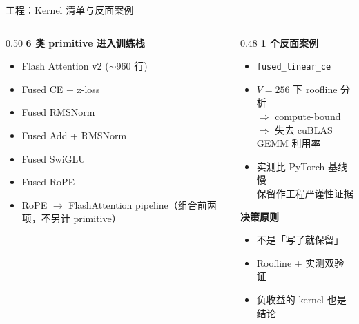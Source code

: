 \documentclass[10pt,aspectratio=169]{beamer}
\begin{document}
\begin{frame}{工程：Kernel 清单与反面案例}
\begin{columns}[T]
\begin{column}{0.50\textwidth}
\textbf{6 类 primitive 进入训练栈}
\begin{itemize}\setlength{\itemsep}{2pt}
  \item Flash Attention v2 ($\sim$960 行)
  \item Fused CE + z-loss
  \item Fused RMSNorm
  \item Fused Add + RMSNorm
  \item Fused SwiGLU
  \item Fused RoPE
  \item RoPE $\to$ FlashAttention pipeline（组合前两项，不另计 primitive）
\end{itemize}
\end{column}
\begin{column}{0.48\textwidth}
\textbf{1 个反面案例}
\begin{itemize}
  \item \texttt{fused\_linear\_ce}
  \item $V = 256$ 下 roofline 分析 \\
        $\Rightarrow$ compute-bound \\
        $\Rightarrow$ 失去 cuBLAS GEMM 利用率
  \item 实测比 PyTorch 基线慢 \\
        \alert{保留作工程严谨性证据}
\end{itemize}

\bigskip
\textbf{决策原则}
\begin{itemize}
  \item 不是「写了就保留」
  \item Roofline + 实测双验证
  \item 负收益的 kernel 也是结论
\end{itemize}
\end{column}
\end{columns}
\end{frame}
\end{document}
